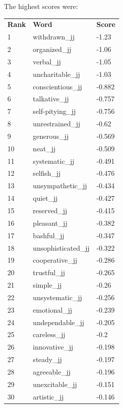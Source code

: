 \documentclass[10pt,letterpaper]{book}
\begin{document}
The highest scores were:
\begin{tabular}{ l l l }
        \textbf{Rank} & \textbf{Word} & \textbf{Score} \\
        1 & withdrawn\_jj & -1.23 \\
        2 & organized\_jj & -1.06 \\
        3 & verbal\_jj & -1.05 \\
        4 & uncharitable\_jj & -1.03 \\
        5 & conscientious\_jj & -0.882 \\
        6 & talkative\_jj & -0.757 \\
        7 & self-pitying\_jj & -0.756 \\
        8 & unrestrained\_jj & -0.62 \\
        9 & generous\_jj & -0.569 \\
        10 & neat\_jj & -0.509 \\
        11 & systematic\_jj & -0.491 \\
        12 & selfish\_jj & -0.476 \\
        13 & unsympathetic\_jj & -0.434 \\
        14 & quiet\_jj & -0.427 \\
        15 & reserved\_jj & -0.415 \\
        16 & pleasant\_jj & -0.382 \\
        17 & bashful\_jj & -0.347 \\
        18 & unsophisticated\_jj & -0.322 \\
        19 & cooperative\_jj & -0.286 \\
        20 & trustful\_jj & -0.265 \\
        21 & simple\_jj & -0.26 \\
        22 & unsystematic\_jj & -0.256 \\
        23 & emotional\_jj & -0.239 \\
        24 & undependable\_jj & -0.205 \\
        25 & careless\_jj & -0.2 \\
        26 & innovative\_jj & -0.198 \\
        27 & steady\_jj & -0.197 \\
        28 & agreeable\_jj & -0.196 \\
        29 & unexcitable\_jj & -0.151 \\
        30 & artistic\_jj & -0.146 \\
\end{tabular}
\end{document}
